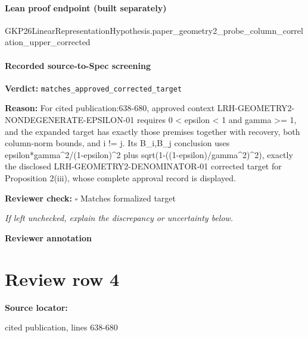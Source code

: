 \documentclass[10pt]{article}
\newcommand{\reviewerbox}{%
  \par\noindent\fbox{\parbox{0.96\linewidth}{\rule{0pt}{0.38in}}}\par
}
\newcommand{\reviewmatch}[1]{%
  \par\noindent\textbf{Reviewer check:} $\square$\; #1\par
  \noindent\emph{If left unchecked, explain the discrepancy or uncertainty below.}\par
}
\begin{document}
\paragraph{Lean proof endpoint (built separately)}\begin{ReviewVerbatim}
GKP26LinearRepresentationHypothesis.paper_geometry2_probe_column_correlation_upper_corrected
\end{ReviewVerbatim}

\paragraph{Recorded source-to-Spec screening}
\textbf{Verdict:} \texttt{matches\_approved\_corrected\_target}
\\
{\raggedright
\textbf{Reason:} For cited publication:\allowbreak{}638-\allowbreak{}680, approved context LRH-\allowbreak{}GEOMETRY2-\allowbreak{}NONDEGENERATE-\allowbreak{}EPSILON-\allowbreak{}01 requires 0 < epsilon < 1 and gamma >= 1, and the expanded target has exactly those premises together with recovery, both column-\allowbreak{}norm bounds, and i != j.\allowbreak{} Its B\_\allowbreak{}i,B\_\allowbreak{}j conclusion uses epsilon*gamma\textasciicircum{}2/\allowbreak{}(1-\allowbreak{}epsilon)\textasciicircum{}2 plus sqrt(1-\allowbreak{}((1-\allowbreak{}epsilon)/\allowbreak{}gamma\textasciicircum{}2)\textasciicircum{}2), exactly the disclosed LRH-\allowbreak{}GEOMETRY2-\allowbreak{}DENOMINATOR-\allowbreak{}01 corrected target for Proposition 2(iii), whose complete approval record is displayed.\allowbreak{}
\par}
\reviewmatch{Matches formalized target}
\noindent\textbf{Reviewer annotation}\par
\reviewerbox
\clearpage
\hypertarget{source-claim-7f9743bbf88fc45a}{}
\section*{Review row 4}
\textbf{Source locator:} {\footnotesize\raggedright cited publication, lines 638-\allowbreak{}680\par}
\end{document}
